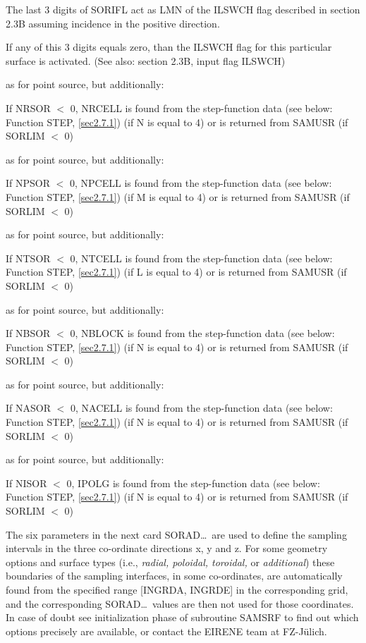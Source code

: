 \begin{description}
        The last 3 digits of SORIFL act as LMN of the ILSWCH flag described in section
        2.3B assuming incidence in the positive direction.

        If any of this 3 digits equals zero, than the ILSWCH flag for this particular
        surface is activated.
        (See also: section 2.3B, input flag ILSWCH)
  \item[NRSOR] as for point source,
        but additionally:

        If NRSOR  $<$	0, NRCELL is found from the step-function data (see below:
        Function STEP,	\cref{sec2.7.1}) (if N is equal to 4) or is returned from
        SAMUSR	(if  SORLIM  $<$   0)
  \item[NPSOR] as for point source, but
        additionally:

        If NPSOR  $<$	0, NPCELL is found from the step-function data (see below:
        Function STEP,	\cref{sec2.7.1}) (if M is equal to 4) or is returned from
        SAMUSR	(if  SORLIM  $<$   0)
  \item[NTSOR] as for point source, but
        additionally:

        If NTSOR  $<$	0, NTCELL is found from the step-function data (see below:
        Function STEP,	\cref{sec2.7.1}) (if L is equal to 4) or is returned from
        SAMUSR	(if  SORLIM  $<$   0)
  \item[NBSOR] as for point source, but
        additionally:

        If NBSOR  $<$	0, NBLOCK is found from the step-function data (see below:
        Function STEP,	\cref{sec2.7.1}) (if N is equal to 4) or is returned from
        SAMUSR	(if  SORLIM  $<$   0)
  \item[NASOR] as for point source, but
        additionally:

        If NASOR  $<$	0, NACELL is found from the step-function data (see below:
        Function STEP, \cref{sec2.7.1}) (if N is equal to 4) or is returned from SAMUSR
             (if  SORLIM  $<$	0)
  \item[NISOR] as for point source, but additionally:

        If NISOR $<$  0, IPOLG is found from the step-function data (see below:
        Function STEP, \cref{sec2.7.1}) (if N is equal to 4) or is returned from SAMUSR
        (if  SORLIM $ < $  0)
\end{description}
The six parameters in the next card
SORAD\dots\ are used to define the sampling intervals in the three co-ordinate
directions x, y and z.
For some geometry options and surface types (i.e., \emph{radial, poloidal, 
toroidal,} or \emph{additional}) these boundaries of the sampling interfaces,
in some co-ordinates, are automatically found from the specified range [INGRDA,
INGRDE] in the corresponding grid, and the corresponding SORAD\dots\ values are
then not used for those coordinates.
In case of doubt see initialization phase of subroutine SAMSRF to find out
which options precisely are available, or contact the EIRENE team at
FZ-J\"ulich.

